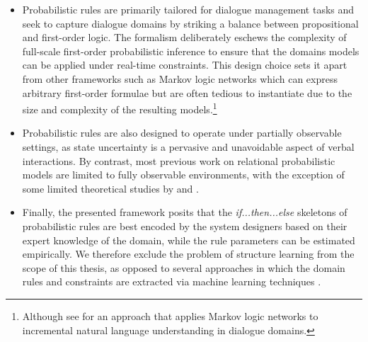 \begin{itemize}

\item Probabilistic rules are primarily tailored for dialogue management tasks and seek to capture dialogue domains by striking a balance between propositional and first-order logic. The formalism deliberately eschews the complexity of full-scale first-order probabilistic inference to ensure that the domains models can be applied under real-time constraints. This design choice sets it apart from other frameworks such as Markov logic networks which can express arbitrary first-order formulae but are often tedious to instantiate due to the size and complexity of the resulting models.\footnote{Although see \cite{Kennington:2012} for an approach that applies Markov logic networks to incremental natural language understanding in dialogue domains.} 

\item Probabilistic rules are also designed to operate under partially observable settings, as state uncertainty is a pervasive and unavoidable aspect of verbal interactions.  By contrast, most previous work on relational probabilistic models are limited to fully observable environments, with the exception of some limited theoretical studies by \cite{Wang:2010} and \cite{SannerK10}. 

\item Finally, the presented framework posits that the \textit{if...then...else} skeletons of probabilistic rules are best encoded by the system designers based on their expert knowledge of the domain, while the rule parameters can be estimated empirically. We therefore exclude the problem of structure learning from the scope of this thesis, as opposed to several approaches in which the domain rules and constraints are extracted via machine learning techniques \citep{PasulaZK07,Kok:2009}.

\end{itemize}

